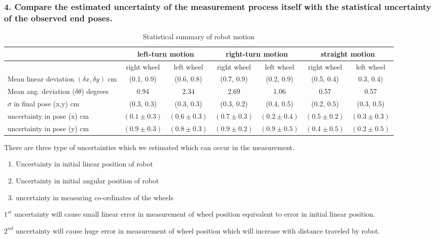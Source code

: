 \newpage
\subsubsection*{4. Compare the estimated uncertainty of the measurement process itself with the statistical uncertainty of the observed end poses.}

\begin{table}[ht]
	\centering
	\begin{tabular}{| l | c | c | c | c | c | c |}
		\hline
		& \multicolumn{2}{c|}{left-turn motion} & \multicolumn{2}{c|}{ right-turn motion} & \multicolumn{2}{c|}{straight motion} \\
		\hline
		& right wheel & left wheel & right wheel & left wheel & right wheel & left wheel \\
		\hline
		Mean linear deviation $(\delta x, \delta y)$ cm & (0.1, 0.9) & (0.6, 0.8)
		& (0.7, 0.9) & (0.2, 0.9) & (0.5, 0.4) & 0.3, 0.4) \\
		\hline
		Mean ang. deviation ($\delta \theta$) degrees & 0.94 & 2.34 & 2.69 & 1.06 & 0.57 & 0.57 \\
		\hline
		$\sigma$ in final pose (x,y) cm & (0.3, 0.3) & (0.3, 0.3) & (0.3, 0.2) & (0.4, 0.5) & (0.2, 0.5) & (0.3, 0.5)\\
		\hline
		uncertainty in pose (x) cm & $(0.1 \pm 0.3)$ & $(0.6 \pm 0.3)$ & $(0.7 \pm 0.3)$ & $(0.2 \pm 0.4)$ & $(0.5 \pm 0.2)$ & $(0.3 \pm 0.3)$ \\
		uncertainty in pose (y) cm & $(0.9 \pm 0.3)$ & $(0.8 \pm 0.3)$ & $(0.9 \pm 0.2)$ & $(0.9 \pm 0.5)$ & $(0.4 \pm 0.5)$ & $(0.2 \pm 0.5)$ \\
		\hline
	\end{tabular}
	\caption{Statistical summary of robot motion}
	\label{stats}
\end{table}
There are three type of uncertainties which we estimated which can occur in the measurement. 
\begin{enumerate}
	\item Uncertainty in initial linear position of robot
	\item Uncertainty in initial angular position of robot
	\item uncertainty in measuring co-ordinates of the wheels
\end{enumerate}   

$1^{st}$ uncertainty will cause small linear error in measurement of wheel position equivalent to error in initial linear position.

$2^{nd}$ uncertainty will cause huge error in measurement of wheel position which will increase with distance traveled by robot. 

